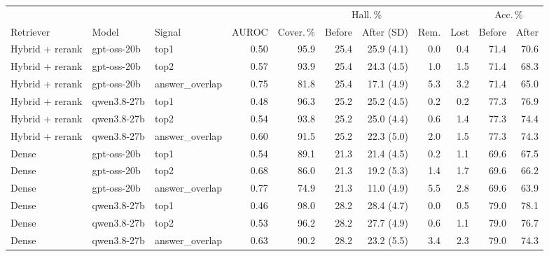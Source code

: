\begin{tabular}{@{}lllrrrrrrrr@{}}
\toprule
 &  &  &  &  & \multicolumn{2}{c}{Hall.\,\%} &  &  & \multicolumn{2}{c}{Acc.\,\%} \\
Retriever & Model & Signal & AUROC & Cover.\,\% & Before & After (SD) & Rem. & Lost & Before & After \\
\midrule
Hybrid + rerank & gpt-oss-20b & top1 & 0.50 & 95.9 & 25.4 & 25.9 (4.1) & 0.0 & 0.4 & 71.4 & 70.6 \\
Hybrid + rerank & gpt-oss-20b & top2 & 0.57 & 93.9 & 25.4 & 24.3 (4.5) & 1.0 & 1.5 & 71.4 & 68.3 \\
Hybrid + rerank & gpt-oss-20b & answer\_overlap & 0.75 & 81.8 & 25.4 & 17.1 (4.9) & 5.3 & 3.2 & 71.4 & 65.0 \\
Hybrid + rerank & qwen3.8-27b & top1 & 0.48 & 96.3 & 25.2 & 25.2 (4.5) & 0.2 & 0.2 & 77.3 & 76.9 \\
Hybrid + rerank & qwen3.8-27b & top2 & 0.54 & 93.8 & 25.2 & 25.0 (4.4) & 0.6 & 1.4 & 77.3 & 74.4 \\
Hybrid + rerank & qwen3.8-27b & answer\_overlap & 0.60 & 91.5 & 25.2 & 22.3 (5.0) & 2.0 & 1.5 & 77.3 & 74.3 \\
\midrule
Dense & gpt-oss-20b & top1 & 0.54 & 89.1 & 21.3 & 21.4 (4.5) & 0.2 & 1.1 & 69.6 & 67.5 \\
Dense & gpt-oss-20b & top2 & 0.68 & 86.0 & 21.3 & 19.2 (5.3) & 1.4 & 1.7 & 69.6 & 66.2 \\
Dense & gpt-oss-20b & answer\_overlap & 0.77 & 74.9 & 21.3 & 11.0 (4.9) & 5.5 & 2.8 & 69.6 & 63.9 \\
Dense & qwen3.8-27b & top1 & 0.46 & 98.0 & 28.2 & 28.4 (4.7) & 0.0 & 0.5 & 79.0 & 78.1 \\
Dense & qwen3.8-27b & top2 & 0.53 & 96.2 & 28.2 & 27.7 (4.9) & 0.6 & 1.1 & 79.0 & 76.7 \\
Dense & qwen3.8-27b & answer\_overlap & 0.63 & 90.2 & 28.2 & 23.2 (5.5) & 3.4 & 2.3 & 79.0 & 74.3 \\
\bottomrule
\end{tabular}
